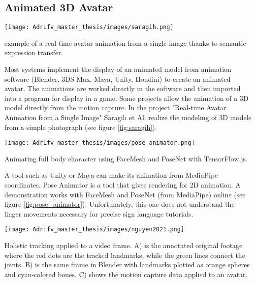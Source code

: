 \subsection{Animated 3D Avatar}

\begin{marginfigure}
    \centering
    \texttt{[image: AdrLfv\_master\_thesis/images/saragih.png]}
    \caption{example of a real-time avatar animation from a single image thanks to semantic expression transfer.}
    \label{fig:saragih}
\end{marginfigure}

Most systems implement the display of an animated model from animation software (Blender, 3DS Max, Maya, Unity, Houdini) to create an animated avatar. The animations are worked directly in the software and then imported into a program for display in a game. 
Some projects allow the animation of a 3D model directly from the motion capture. In the project "Real-time Avatar Animation from a Single Image" \cite{saragih2011real} Saragih et Al. realize the modeling of 3D models from a simple photograph (see figure \ref{fig:saragih}). 

\begin{marginfigure}
    \centering
    \texttt{[image: AdrLfv\_master\_thesis/images/pose\_animator.png]}
    \caption{Animating full body character using FaceMesh and PoseNet with TensorFlow.js.}
    \label{fig:pose_animator}
\end{marginfigure}

A tool such as Unity or Maya can make its animation from MediaPipe coordinates. Pose Animator is a tool that gives rendering for 2D animation. A demonstration works with FaceMesh and PoseNet (from MediaPipe) online \cite{pose_animator} (see figure \ref{fig:pose_animator}). Unfortunately, this one does not understand the finger movements necessary for precise sign language tutorials.

\begin{marginfigure}
    \centering
    \texttt{[image: AdrLfv\_master\_thesis/images/nguyen2021.png]}
    \caption{Holistic tracking applied to a video frame. A) is the annotated original footage where
    the red dots are the tracked landmarks, while the green lines connect the joints. B) is the same
    frame in Blender with landmarks plotted as orange spheres and cyan-colored bones. C) shows the motion capture data applied to an avatar. \cite{nguyen2021automatic}}
    \label{fig:nguyen2021}
\end{marginfigure}

